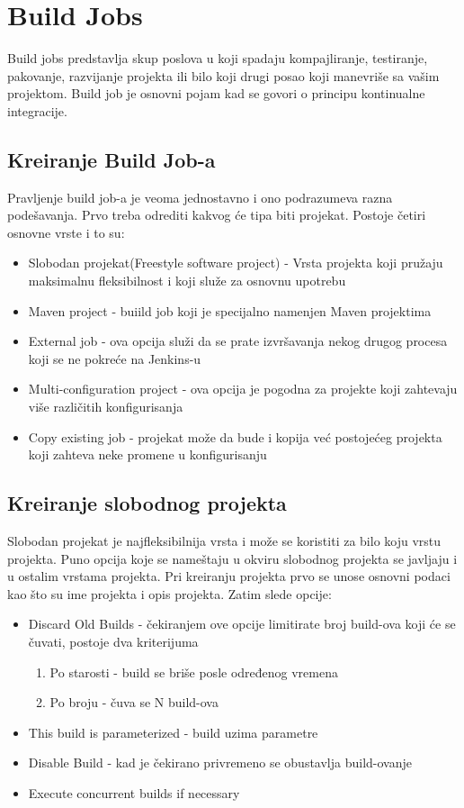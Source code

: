 \section{Build Jobs}

Build jobs predstavlja skup poslova u koji spadaju kompajliranje, testiranje, pakovanje, razvijanje projekta ili bilo koji drugi posao koji manevriše sa vašim projektom. Build job je osnovni pojam kad se govori o principu kontinualne integracije. 

\subsection{Kreiranje Build Job-a}

Pravljenje build job-a je veoma jednostavno i ono podrazumeva razna podešavanja. Prvo treba odrediti kakvog će tipa biti projekat. Postoje četiri osnovne vrste i to su:
\begin{itemize}  
\item Slobodan projekat(Freestyle software project) - Vrsta projekta koji pružaju maksimalnu fleksibilnost i koji služe za osnovnu upotrebu
\item Maven project - buiild job koji je specijalno namenjen Maven projektima 
\item External job - ova opcija služi da se prate izvršavanja nekog drugog procesa koji se ne pokreće na Jenkins-u
\item Multi-configuration project - ova opcija je pogodna za projekte koji zahtevaju više različitih konfigurisanja
\item Copy existing job - projekat može da bude i kopija već postojećeg projekta koji zahteva neke promene u konfigurisanju
\end{itemize}  

\subsection{Kreiranje slobodnog projekta}

Slobodan projekat je najfleksibilnija vrsta i može se koristiti za bilo koju vrstu projekta. Puno opcija koje se nameštaju u okviru slobodnog projekta se javljaju i u ostalim vrstama projekta. Pri kreiranju projekta prvo se unose osnovni podaci kao što su ime projekta i opis projekta. Zatim slede opcije:

\begin{itemize}  
\item Discard Old Builds - čekiranjem ove opcije limitirate broj build-ova koji će se čuvati, postoje dva kriterijuma 
\begin{enumerate}
\item Po starosti - build se briše posle određenog vremena
\item Po broju - čuva se N build-ova
\end{enumerate}
\item This build is parameterized - build uzima parametre
\item Disable Build - kad je čekirano privremeno se obustavlja build-ovanje
\item Execute concurrent builds if necessary
\end{itemize}

